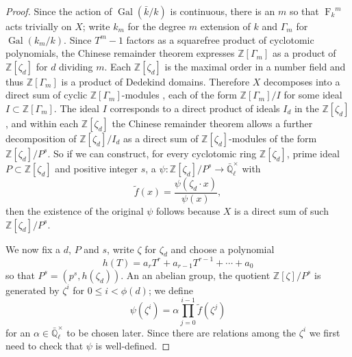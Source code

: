 \documentclass[11pt]{amsart}
\theoremstyle{plain}
\theoremstyle{definition}
\theoremstyle{remark}
\newcommand{\ZZ}{{\mathbb{Z}}}
\newcommand{\EE}{\mathbb{\bar Q}_\ell}
\newcommand{\bFq}{\bar{k}}
\newcommand{\Fq}{k}
\newcommand{\Fqm}{k_m}
\newcommand{\EEx}{\EE^\times}
\DeclareMathOperator{\Gal}{Gal}
\newcommand{\Frob}[1]{{\operatorname{F}_{#1}}}
\begin{document}
\begin{proof}
  Since the action of $\Gal(\bFq/\Fq)$ is continuous, there is an $m$
  so that $\Frob{\Fq}^m$ acts trivially on $X$; write $\Fqm$ for the degree
  $m$ extension of $\Fq$ and $\Gamma_m$ for $\Gal(\Fqm/\Fq)$.  Since
  $T^m-1$ factors as a squarefree product of cyclotomic polynomials,
  the Chinese remainder theorem expresses $\ZZ[\Gamma_m]$ as a product
  of $\ZZ[\zeta_d]$ for $d$ dividing $m$.  Each $\ZZ[\zeta_d]$ is the
  maximal order in a number field and thus $\ZZ[\Gamma_m]$ is a
  product of Dedekind domains.  Therefore $X$ decomposes into a direct
  sum of cyclic $\ZZ[\Gamma_m]$-modules \cite[?]{Brandal}, each of the
  form $\ZZ[\Gamma_m] / I$ for some ideal $I \subset \ZZ[\Gamma_m]$.
  The ideal $I$ corresponds to a direct product of ideals $I_d$ in the
  $\ZZ[\zeta_d]$, and within each $\ZZ[\zeta_d]$ the Chinese remainder
  theorem allows a further decomposition of $\ZZ[\zeta_d] / I_d$ as a
  direct sum of $\ZZ[\zeta_d]$-modules of the form $\ZZ[\zeta_d]/P^s$.
  So if we can construct, for every cyclotomic ring $\ZZ[\zeta_d]$,
  prime ideal $P \subset \ZZ[\zeta_d]$ and positive integer $s$, a
  $\psi \colon \ZZ[\zeta_d]/P^s \rightarrow \EEx$ with
  \begin{equation} \label{eq:psi-condition}
    \tilde{f}(x) = \frac{\psi(\zeta_d \cdot x)}{\psi(x)},
  \end{equation}
  then the existence of the original $\psi$ follows because $X$ is a
  direct sum of such $\ZZ[\zeta_d]/P^s$.

  We now fix a $d$, $P$ and $s$, write $\zeta$ for $\zeta_d$ and
  choose a polynomial
  $$h(T) = a_rT^r + a_{r-1}T^{r-1} + \cdots + a_0$$
  so that $P^s = (p^s, h(\zeta_d))$.
  An an abelian group, the quotient $\ZZ[\zeta] / P^s$ is generated by
  $\zeta^i$ for $0 \le i < \phi(d)$; we define
  \begin{equation} \label{eq:psi-def}
    \psi(\zeta^i) = \alpha \prod_{j=0}^{i-1} \tilde{f}(\zeta^j)
  \end{equation}
  for an $\alpha \in \EEx$ to be chosen later.  Since there are
  relations among the $\zeta^i$ we first need to check that $\psi$ is
  well-defined.


\end{proof}
\end{document}
